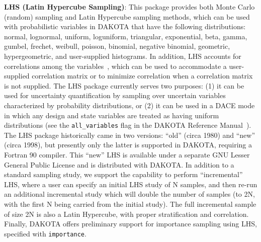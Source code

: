 \textbf{LHS (Latin Hypercube Sampling)}: This package provides both
Monte Carlo (random) sampling and Latin Hypercube sampling methods,
which can be used with probabilistic variables in DAKOTA that have the
following distributions: normal, lognormal, uniform, loguniform,
triangular, exponential, beta, gamma, gumbel, frechet, weibull, poisson, 
binomial, negative binomial, geometric, hypergeometric, and
user-supplied histograms. In addition, LHS accounts for correlations
among the variables~\cite{Ima84}, which can be used to accommodate a
user-supplied correlation matrix or to minimize correlation when a
correlation matrix is not supplied. The LHS package currently serves
two purposes: (1) it can be used for uncertainty quantification by
sampling over uncertain variables characterized by probability
distributions, or (2) it can be used in a DACE mode in which any
design and state variables are treated as having uniform distributions
(see the \texttt{all\_variables} flag in the DAKOTA Reference
Manual~\cite{RefMan}). The LHS package historically came in two
versions: ``old'' (circa 1980) and ``new'' (circa 1998), but presently
only the latter is supported in DAKOTA, requiring a Fortran 90
compiler.  This ``new'' LHS is available under a separate GNU Lesser
General Public License and is distributed with DAKOTA.  In addition 
to a standard sampling study, we support the capability to perform 
``incremental'' LHS, where a user can specify an initial LHS study 
of N samples, and then re-run an additional incremental study which 
will double the number of samples (to 2N, with the first N being 
carried from the initial study).  The full incremental sample of 
size 2N is also a Latin Hypercube, with proper stratification and 
correlation.  Finally, DAKOTA offers preliminary support for 
importance sampling using LHS, specified with \texttt{importance}.

